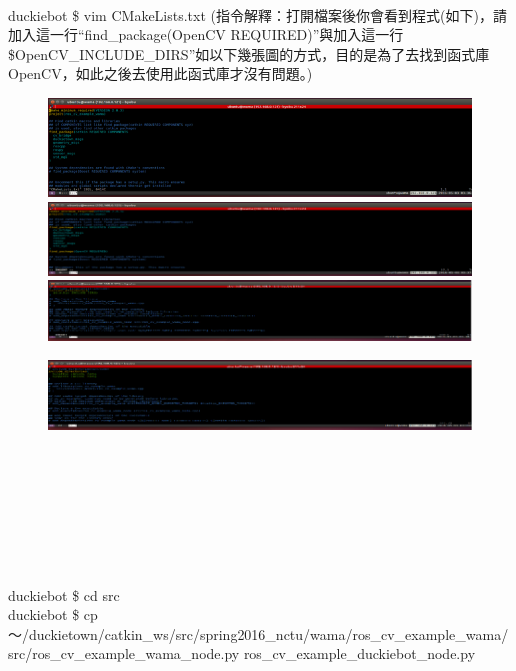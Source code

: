 \documentclass{article}
\begin{document}
\\
duckiebot \$ vim CMakeLists.txt 
(指令解釋：打開檔案後你會看到程式(如下)，請加入這一行“find\_package(OpenCV REQUIRED)”與加入這一行\${OpenCV\_INCLUDE\_DIRS}”如以下幾張圖的方式，目的是為了去找到函式庫OpenCV，如此之後去使用此函式庫才沒有問題。)
\begin{figure}[htp]
    \begin{center}
        \includegraphics[width=400pt]{pic/5_2_6.png}
        \includegraphics[width=400pt]{pic/5_2_7.png}
        \includegraphics[width=400pt]{pic/5_2_8.png}
    \end{center}
\end{figure}
\begin{figure}[htp]
    \begin{center}
        \includegraphics[width=400pt]{pic/5_2_9.png}
    \end{center}
\end{figure}
\\
\\\\\\\\\\\\duckiebot \$ cd src
\\duckiebot \$ cp ～/duckietown/catkin\_ws/src/spring2016\_nctu/wama/ros\_cv\_example\_wama/src/ros\_cv\_example\_wama\_node.py ros\_cv\_example\_duckiebot\_node.py 
\end{document}
